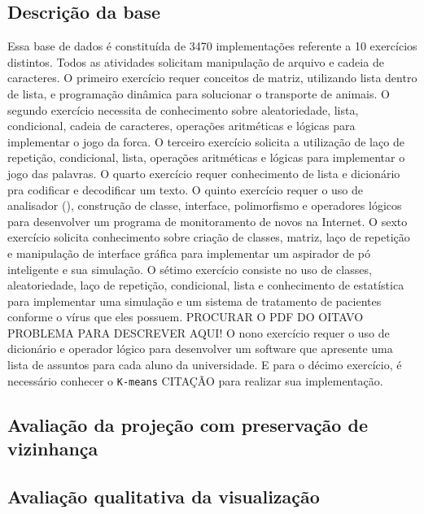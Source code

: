 	\subsection{Descrição da base}
	Essa base de dados é constituída de 3470 implementações referente a 10 exercícios
	distintos. Todos as atividades solicitam manipulação de arquivo e cadeia de caracteres.
	O primeiro exercício requer conceitos de matriz, utilizando lista dentro
	de lista, e programação dinâmica para solucionar o transporte de animais. O segundo
	exercício necessita de conhecimento sobre aleatoriedade, lista, condicional, cadeia
	de caracteres, operações aritméticas e lógicas para implementar o jogo da forca. O
	terceiro exercício solicita a utilização de laço de repetição, condicional, lista,
	operações aritméticas e lógicas para implementar o jogo das palavras. O quarto
	exercício requer conhecimento de lista e dicionário pra codificar e decodificar um
	texto. O quinto exercício requer o uso de analisador (), construção
	de classe, interface, polimorfismo e operadores lógicos para desenvolver um programa
	de monitoramento de novos  na Internet. O sexto exercício solicita
	conhecimento sobre criação de classes, matriz, laço de repetição e manipulação de
	interface gráfica para implementar um aspirador de pó inteligente e sua simulação.
	O sétimo exercício consiste no uso de classes, aleatoriedade, laço de repetição,
	condicional, lista e conhecimento de estatística para implementar uma simulação
	e um sistema de tratamento de pacientes conforme o vírus que eles possuem.
	PROCURAR O PDF DO OITAVO PROBLEMA PARA DESCREVER AQUI!
	O nono exercício requer o uso de dicionário e operador lógico para desenvolver um
	software que apresente uma lista de assuntos para cada aluno da universidade. E
	para o décimo exercício, é necessário conhecer o \texttt{K-means} CITAÇÃO para realizar
	sua implementação.
	
	

\subsection{Avaliação da projeção com preservação de vizinhança}


\subsection{Avaliação qualitativa da visualização}



